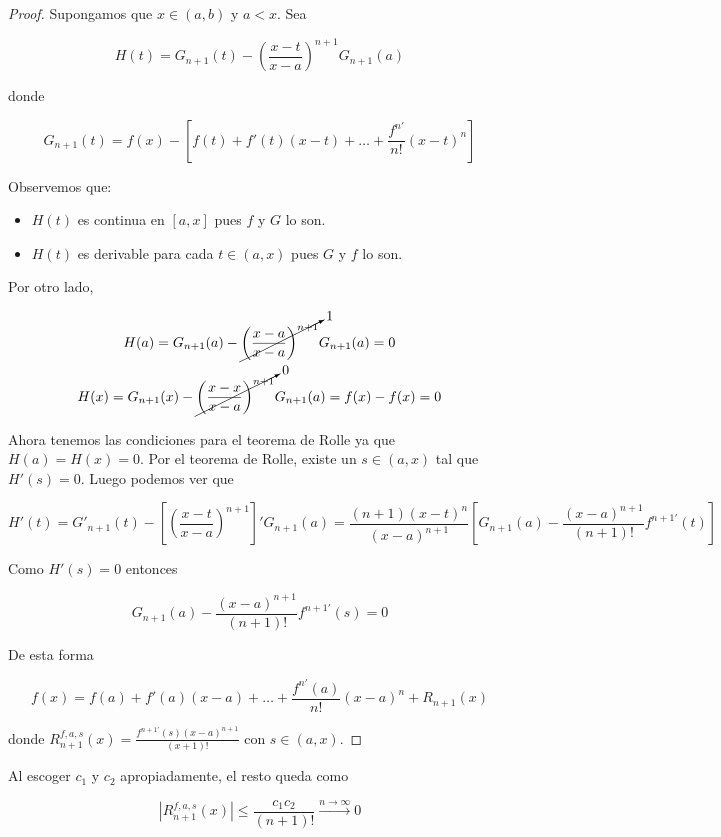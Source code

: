 \begin{proof}
    Supongamos que $x \in (a,b)$ y $a < x$. Sea
    
    \[
    H(t) = G_{n+1}(t) - \left(\frac{x-t}{x-a}\right)^{n+1}G_{n+1}(a)
    \]
    
    \noindent donde
    
    \[
    G_{n+1}(t) = f(x) - \left[f(t) + f'(t)(x-t) + \dots + \frac{f^{n'}}{n!}(x-t)^n\right]
    \]
    
    Observemos que:
    
    \begin{itemize}
        \item $H(t)$ es continua en $[a,x]$ pues $f$ y $G$ lo son.
        \item $H(t)$ es derivable para cada $t \in (a,x)$ pues $G$ y $f$ lo son.
    \end{itemize}
    
    Por otro lado,
    
    \begin{gather*}
        H(a) = G_{n+1}(a) -  \cancelto{1}{\left(\frac{x-a}{x-a}\right)^{n+1}} G_{n+1}(a) = 0 \\
        H(x) = G_{n+1}(x) - \cancelto{0}{\left(\frac{x-x}{x-a} \right)^{n+1}}G_{n+1}(a) = f(x) - f(x) = 0    
    \end{gather*}
    
    Ahora tenemos las condiciones para el teorema de Rolle ya que $H(a) = H(x) = 0$. Por el teorema de Rolle, existe un $s \in (a,x)$ tal que $H'(s) = 0$. Luego podemos ver que
    
    \[
    H'(t) = G'_{n+1}(t) - \left[\left(\frac{x-t}{x-a}\right)^{n+1}\right]'G_{n+1}(a) = \frac{(n+1)(x-t)^n}{(x-a)^{n+1}}\left[G_{n+1}(a) - \frac{(x-a)^{n+1}}{(n+1)!}f^{n+1'}(t)\right]
    \]
    
    Como $H'(s) = 0$ entonces
    
    \[
    G_{n+1}(a) - \frac{(x-a)^{n+1}}{(n+1)!}f^{n+1'}(s) = 0
    \]
    
    De esta forma
    
    \[
    f(x) = f(a) + f'(a)(x-a) + \dots + \frac{f^{n'}(a)}{n!}(x-a)^n + R_{n+1}(x)
    \]
    
    \noindent donde $\displaystyle R_{n+1}^{f,a,s}(x) = \frac{f^{n+1'}(s)(x-a)^{n+1}}{(x+1)!}$ con $s \in (a,x)$.
\end{proof}

Al escoger $c_1$ y $c_2$ apropiadamente, el resto queda como

\[
\left|R_{n+1}^{f,a,s}(x)\right| \leq \frac{c_1c_2}{(n+1)!} \xrightarrow[]{n \to \infty} 0
\]

